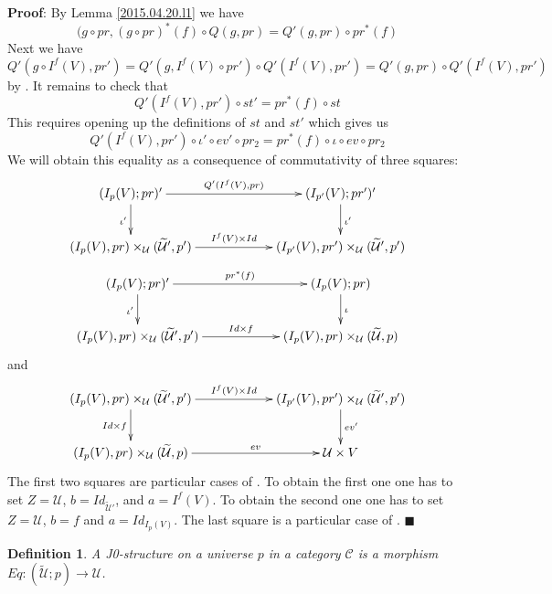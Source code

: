 \documentclass[12pt]{article}
\numberwithin{equation}{section}
\newenvironment{myproof}{{\bf Proof}:}{$\blacksquare$ \vskip 5mm }
\newtheorem{definition}[proposition]{Definition}
\newcommand{\llabel}[1]{\label{#1}}
\newcommand{\sr}{\rightarrow}
\newcommand{\wt}{\widetilde}
\newcommand{\U}{\mathcal{U}}
\begin{document}
\begin{myproof}
By Lemma \ref{2015.04.20.l1} we have
%
$$(g\circ pr, (g\circ pr)^*(f)\circ Q(g,pr)=Q'(g,pr)\circ pr^*(f)$$
%
Next we have
%
$$Q'(g\circ I^f(V), pr')=Q'(g,I^f(V)\circ pr')\circ
Q'(I^f(V),pr')=Q'(g,pr)\circ Q'(I^f(V),pr')$$
%
by \cite[Lemma 3.2]{fromunivwithPi}. It remains to check that
%
$$Q'(I^f(V),pr')\circ st'=pr^*(f)\circ st$$
%
This requires opening up the definitions of $st$ and $st'$ which gives us
%
$$Q'(I^f(V),pr')\circ \iota'\circ ev'\circ pr_2=pr^*(f)\circ \iota\circ ev\circ
pr_2$$
%
We will obtain this equality as a consequence of commutativity of three
squares:
%
$$
\begin{xy}
          \xymatrix@C=5pc{ (I_p(V);pr)' \ar[r]^-{Q'(I^f(V),pr)} \ar[d]_{\iota'}
            & (I_{p'}(V);pr')'
            \ar[d]^{\iota'}\\ (I_p(V),pr)\times_\U(\wt{\U}',p')
            \ar[r]^-{I^f(V)\times Id} & (I_{p'}(V),pr')\times_\U(\wt{\U}',p') }
\end{xy}
$$
%
$$
\begin{xy}
          \xymatrix@C=5pc{ (I_p(V);pr)' \ar[r]^-{pr^*(f)} \ar[d]_{\iota'} &
            (I_{p}(V);pr) \ar[d]^{\iota}\\ (I_p(V),pr)\times_\U(\wt{\U}',p')
            \ar[r]^-{Id\times f} & (I_{p}(V),pr)\times_\U(\wt{\U},p) }
\end{xy}
$$
%
and
%
$$
\begin{xy}
          \xymatrix@C=5pc{ (I_p(V),pr)\times_\U(\wt{\U}',p')
            \ar[r]^-{I^f(V)\times Id} \ar[d]_{Id\times f} &
            (I_{p'}(V),pr')\times_\U(\wt{\U}',p')
            \ar[d]^{ev'}\\ (I_p(V),pr)\times_\U(\wt{\U},p) \ar[r]^-{ev} & \U\times
            V }
\end{xy}
$$
%
The first two squares are particular cases of \cite[Lemma
  8.1]{fromunivwithPi}. To obtain the first one one has to set $Z=\U$,
$b=Id_{\wt{\U}'}$, and $a=I^f(V)$. To obtain the second one one has to set
$Z=\U$, $b=f$ and $a=Id_{I_p(V)}$. The last square is a particular case of
\cite[Lemma 8.6]{fromunivwithPi}.
%
\end{myproof}
%
\begin{definition}
\llabel{2015.03.27.def4} A J0-structure on a universe $p$ in a category
$\mathcal C$ is a morphism $Eq:(\wt{\U};p)\sr \U$.
\end{definition}
%
\end{document}
